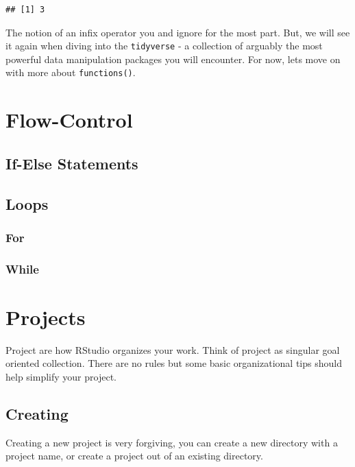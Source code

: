 \documentclass[
]{book}
\begin{document}
\begin{verbatim}
## [1] 3
\end{verbatim}

The notion of an infix operator you and ignore for the most part. But, we will see it again when diving into the \texttt{tidyverse} - a collection of arguably the most powerful data manipulation packages you will encounter. For now, lets move on with more about \texttt{functions()}.

\hypertarget{flow-control}{%
\section{Flow-Control}\label{flow-control}}

\hypertarget{if-else-statements}{%
\subsection{If-Else Statements}\label{if-else-statements}}

\hypertarget{loops}{%
\subsection{Loops}\label{loops}}

\hypertarget{for}{%
\subsubsection{For}\label{for}}

\hypertarget{while}{%
\subsubsection{While}\label{while}}

\hypertarget{projects}{%
\section{Projects}\label{projects}}

Project are how RStudio organizes your work. Think of project as singular goal oriented collection. There are no rules but some basic organizational tips should help simplify your project.

\hypertarget{creating}{%
\subsection{Creating}\label{creating}}

Creating a new project is very forgiving, you can create a new directory with a project name, or create a project out of an existing directory.
\end{document}
